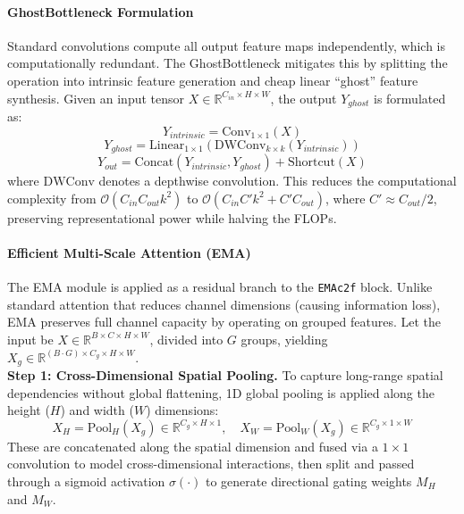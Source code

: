 \paragraph{GhostBottleneck Formulation}

Standard convolutions compute all output feature maps independently, which is computationally redundant. The GhostBottleneck mitigates this by splitting the operation into intrinsic feature generation and cheap linear ``ghost'' feature synthesis. Given an input tensor $X \in \mathbb{R}^{C_{in} \times H \times W}$, the output $Y_{ghost}$ is formulated as:
\begin{equation}
    Y_{intrinsic} = \text{Conv}_{1 \times 1}(X)
\end{equation}
\begin{equation}
    Y_{ghost} = \text{Linear}_{1 \times 1}(\text{DWConv}_{k \times k}(Y_{intrinsic}))
\end{equation}
\begin{equation}
    Y_{out} = \text{Concat}(Y_{intrinsic}, Y_{ghost}) + \text{Shortcut}(X)
\end{equation}
where $\text{DWConv}$ denotes a depthwise convolution. This reduces the computational complexity from $\mathcal{O}(C_{in} C_{out} k^2)$ to $\mathcal{O}(C_{in} C' k^2 + C' C_{out})$, where $C' \approx C_{out}/2$, preserving representational power while halving the FLOPs.

\paragraph{Efficient Multi-Scale Attention (EMA)}

The EMA module is applied as a residual branch to the \texttt{EMAc2f} block. Unlike standard attention that reduces channel dimensions (causing information loss), EMA preserves full channel capacity by operating on grouped features. Let the input be $X \in \mathbb{R}^{B \times C \times H \times W}$, divided into $G$ groups, yielding $X_g \in \mathbb{R}^{(B \cdot G) \times C_g \times H \times W}$.\\

\textbf{Step 1: Cross-Dimensional Spatial Pooling.} To capture long-range spatial dependencies without global flattening, 1D global pooling is applied along the height ($H$) and width ($W$) dimensions:
\begin{equation}
    X_H = \text{Pool}_H(X_g) \in \mathbb{R}^{C_g \times H \times 1}, \quad X_W = \text{Pool}_W(X_g) \in \mathbb{R}^{C_g \times 1 \times W}
\end{equation}
These are concatenated along the spatial dimension and fused via a $1 \times 1$ convolution to model cross-dimensional interactions, then split and passed through a sigmoid activation $\sigma(\cdot)$ to generate directional gating weights $M_H$ and $M_W$.\\

